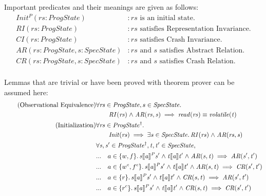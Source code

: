 \documentclass[letterpaper,twocolumn,10pt]{article}
\theoremstyle{definition}
\newcommand{\conj}{\mathrel\land}
\renewcommand{\i}[1]{\ensuremath{\mathit{#1}}}
\begin{document}
Important predicates and their meanings are given as follows:
\begin{align*}
	\i{Init^P(rs : ProgState)} &: \text{$\i{rs}$ is an initial state.}\\
	\i{RI(rs : ProgState)} &: \text{$\i{rs}$ satisfies Representation Invariance.} \\
	\i{CI(rs : ProgState)} &: \text{$\i{rs}$ satisfies Crash Invariance.} \\
	\i{AR(rs : ProgState, s : SpecState)} &: \text{$\i{rs}$ and $s$ satisfies Abstract Relation.} \\
	\i{CR(rs : ProgState, s : SpecState)} &: \text{$\i{rs}$ and $s$ satisfies Crash Relation.} \\
\end{align*}

Lemmas that are trivial or have been proved with theorem prover can be assumed here:
\begin{align*}
	\tag{Observational Equivalence} & \forall \i{rs} \in \i{ProgState},s \in \i{SpecState} \ldotp \\
	& \qquad \i{RI(rs)} \conj \i{AR(rs, s)} \implies \i{read(rs)} \equiv \i{volatile(t)} \\
	\tag{Initialization}\label{Initialization} &\forall \i{rs} \in \i{ProgState^\dagger} \ldotp\\
	&\qquad \i{Init(rs) \implies \exists s \in SpecState \ldotp RI(rs) \conj AR(rs, s)}\\
	&\i{\forall s, s' \in ProgState^\dagger, t, t' \in SpecState,}\\
	&...	 \quad a \in \{w, f\} \ldotp \i{s \llbracket a \rrbracket^P s' \conj t \llbracket a \rrbracket t' \conj AR(s, t) \implies AR(s', t')}\\
	&...	 \quad a \in \{w^c, f^c\} \ldotp \i{s \llbracket a \rrbracket^P s' \conj t \llbracket a \rrbracket t' \conj AR(s, t) \implies CR(s', t')}\\
	&...	 \quad a \in \{r\} \ldotp \i{s \llbracket a \rrbracket^P s' \conj t \llbracket a \rrbracket t' \conj CR(s, t) \implies AR(s', t')}\\
	&...	 \quad a \in \{r^c\} \ldotp \i{s \llbracket a \rrbracket^P s' \conj t \llbracket a \rrbracket t' \conj CR(s, t) \implies CR(s', t')}\\
\end{align*}
\end{document}
